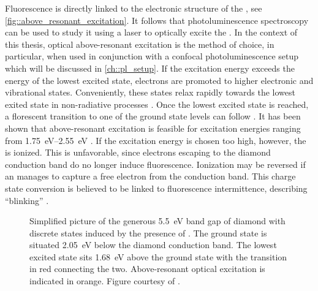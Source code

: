     Fluorescence is directly linked to the electronic structure of the \siv, see \autoref{fig::above_resonant_excitation}. It follows that photoluminescence spectroscopy can be used to study it using a laser to optically excite the \siv. In the context of this thesis, optical above-resonant excitation is the method of choice, in particular, when used in conjunction with a confocal photoluminescence setup which will be discussed in \autoref{ch::pl_setup}.
    If the excitation energy exceeds the energy of the lowest excited state, electrons are promoted to higher electronic and vibrational states. Conveniently, these states relax rapidly towards the lowest exited state in non-radiative processes \cite{Gali2013b}. Once the lowest excited state is reached, a florescent transition to one of the ground state levels can follow . It has been shown that above-resonant excitation is feasible for excitation energies ranging from \SIrange{1.75}{2.55}{\eV}  \cite{iakoubovskii2001optical, Iakoubovskii2000, Rossi1997}. If the excitation energy is chosen too high, however, the \siv is ionized. This is unfavorable, since electrons escaping to the diamond conduction band do no longer induce fluorescence. Ionization may be reversed if an \siv manages to capture a free electron from the conduction band. This charge state conversion is believed to be linked to fluorescence intermittence, describing ``blinking'' \sivs \cite{Muller2011, Siyushev2009}.

    \begin{figure}[htbp]
      \centering
      \caption[Band gap of \sivs hosted in diamond]{Simplified picture of the generous \SI{5.5}{\eV} band gap of diamond with discrete states induced by the presence of \sivs. The \siv ground state is situated \SI{2.05}{\eV} below the diamond conduction band. The lowest excited state sits \SI{1.68}{\eV} above the ground state with the \zpl transition in red connecting the two. Above-resonant optical excitation is indicated in orange. Figure courtesy of \cite{BeckerMasterThesis}.}
      \label{fig::above_resonant_excitation}
    \end{figure}

